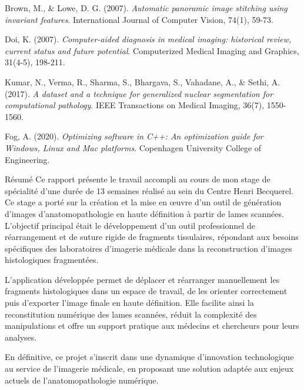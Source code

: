 \documentclass[12pt,a4paper]{report}
\begin{document}
\begin{thebibliography}{20}
Brown, M., \& Lowe, D. G. (2007). 
\textit{Automatic panoramic image stitching using invariant features}. 
International Journal of Computer Vision, 74(1), 59-73.

Doi, K. (2007). 
\textit{Computer-aided diagnosis in medical imaging: historical review, current status and future potential}. 
Computerized Medical Imaging and Graphics, 31(4-5), 198-211.

Kumar, N., Verma, R., Sharma, S., Bhargava, S., Vahadane, A., \& Sethi, A. (2017). 
\textit{A dataset and a technique for generalized nuclear segmentation for computational pathology}. 
IEEE Transactions on Medical Imaging, 36(7), 1550-1560.

Fog, A. (2020). 
\textit{Optimizing software in C++: An optimization guide for Windows, Linux and Mac platforms}. 
Copenhagen University College of Engineering.

\end{thebibliography}

\newpage
\thispagestyle{empty}

\begin{resume}{Résumé}
Ce rapport présente le travail accompli au cours de mon stage de spécialité d'une durée de 13 semaines réalisé au sein du Centre Henri Becquerel. Ce stage a porté sur la création et la mise en œuvre d'un outil de génération d'images d'anatomopathologie en haute définition à partir de lames scannées. L'objectif principal était le développement d'un outil professionnel de réarrangement et de suture rigide de fragments tissulaires, répondant aux besoins spécifiques des laboratoires d'imagerie médicale dans la reconstruction d'images histologiques fragmentées.

L'application développée permet de déplacer et réarranger manuellement les fragments histologiques dans un espace de travail, de les orienter correctement puis d'exporter l'image finale en haute définition. Elle facilite ainsi la reconstitution numérique des lames scannées, réduit la complexité des manipulations et offre un support pratique aux médecins et chercheurs pour leurs analyses.

En définitive, ce projet s'inscrit dans une dynamique d'innovation technologique au service de l'imagerie médicale, en proposant une solution adaptée aux enjeux actuels de l'anatomopathologie numérique.
\end{resume}
\end{document}
